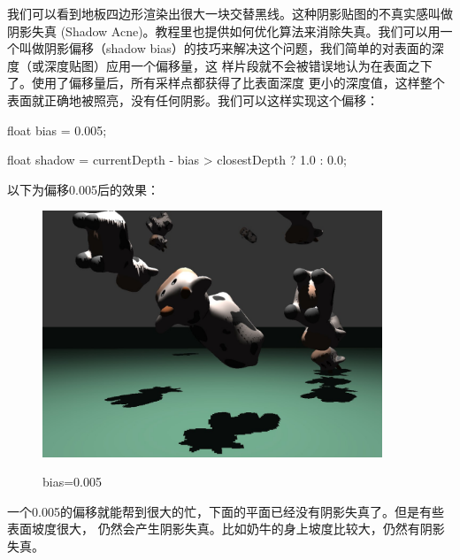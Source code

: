 \documentclass{article}
\begin{document}
	我们可以看到地板四边形渲染出很大一块交替黑线。这种阴影贴图的不真实感叫做阴影失真
	(Shadow 
	Acne)。教程里也提供如何优化算法来消除失真。我们可以用一个叫做阴影偏移（shadow 
	bias）的技巧来解决这个问题，我们简单的对表面的深度（或深度贴图）应用一个偏移量，这
	样片段就不会被错误地认为在表面之下了。使用了偏移量后，所有采样点都获得了比表面深度
	更小的深度值，这样整个表面就正确地被照亮，没有任何阴影。我们可以这样实现这个偏移：
	\begin{framed}
		float bias = 0.005;
		
		float shadow = currentDepth - bias > closestDepth  ? 1.0 : 0.0;
	\end{framed}
	以下为偏移0.005后的效果：\clearpage
	\begin{figure}[htb]
		\caption{\label{table.label} bias=0.005} \centering
		\begin{center}
			\includegraphics[width=4in]{shadow2.jpg}
			\label{figure.label}
		\end{center}
	\end{figure}

	一个0.005的偏移就能帮到很大的忙，下面的平面已经没有阴影失真了。但是有些表面坡度很大，
	仍然会产生阴影失真。比如奶牛的身上坡度比较大，仍然有阴影失真。
	
\end{document}
